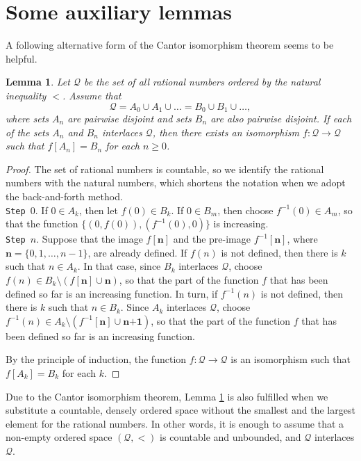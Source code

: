 \documentclass[12pt,a4paper,leqno]{amsart}
\newtheorem{lem}[thm]{Lemma}
\theoremstyle{definition}
\begin{document}
	\section{Some auxiliary  lemmas}
A following alternative form of the Cantor isomorphism theorem  seems to  be helpful. 
  \begin{lem}\label{le2}
	Let $\mathcal Q$ be the set of all rational numbers ordered by the   natural inequality $<$. Assume that  
$$\mathcal Q = A_0\cup A_1\cup\ldots =  B_0\cup B_1\cup \ldots, $$ where sets $A_n$ are pairwise disjoint and sets $B_n$ are also pairwise disjoint. 
If each of the sets $A_n$ and $B_n$ interlaces $\mathcal Q$, then there exists an isomorphism $f\colon \mathcal Q \to \mathcal Q$ such that $f[A_n]=B_n$ for each $n\geqslant 0$.
  \end{lem}
  \begin{proof} The set of rational numbers is countable, so   we  identify the rational numbers with the natural numbers, which  shortens the notation when we adopt the back-and-forth method. \\ \indent \texttt{Step $0.$} If $0\in A_k$, then let $f(0)\in B_k$. If $0\in B_m$, 
then choose $f^{-1}(0)\in A_m $, so that the function $\{(0,f(0)), (f^{-1}(0), 0)\}$ is increasing. \\ \indent \texttt{Step $n.$} Suppose that the image $f[ \textbf{n}]$ and the pre-image
 $f^{-1}[\textbf{n}]$, where $\textbf{n}=\{0,1,\ldots,n-1\}$, are already defined.  If $f(n)$ is not defined, then there  is $k$ such that  $n\in A_k$. In that case, since $B_k$ interlaces $\mathcal Q$, choose $f(n)\in B_k \setminus (f[\textbf{n}]\cup \textbf{n})$, so that the part of the function $f$ that has been defined so far is an increasing function. In turn, if $f^{-1}(n)$ is not defined, then there is $k$ such that 
$n\in B_k$. Since $A_k$ interlaces  $\mathcal Q$, choose $f^{-1}(n)\in A_k \setminus (f^{-1}[\textbf{n}]\cup \textbf{n+1})$, so that the part of the function $f$ that has been defined so far is an increasing function. 

By the principle of induction, the function $f\colon \mathcal Q \to \mathcal Q$ is an isomorphism such that $f[A_k]= B_k$ for each $k$. 
  \end{proof}
Due to the Cantor isomorphism theorem, Lemma \ref{le2} is also fulfilled when we substitute a countable, densely ordered space without the smallest and the largest element for the rational numbers. In other words, it is enough to assume  that a non-empty  ordered space $(\mathcal Q,<)$   is countable and unbounded,  and $\mathcal Q$ interlaces $\mathcal Q$.
\end{document}
